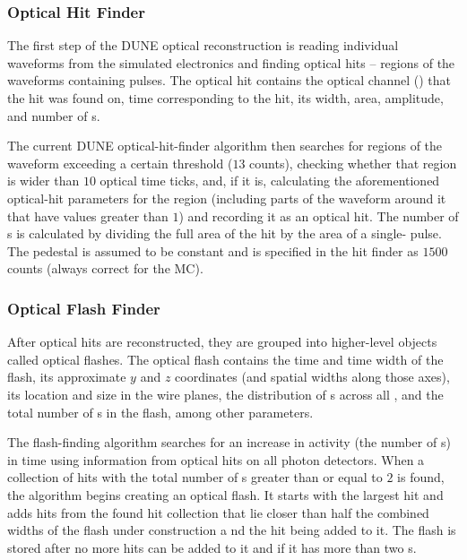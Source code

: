 \subsubsection{Optical Hit Finder}
\label{sec:OpticalHitFinder}
The first step of the DUNE optical reconstruction is reading
individual waveforms from the simulated  electronics
and finding optical hits -- regions of the waveforms containing pulses.
The optical hit contains the optical channel () that the hit
was found on, time corresponding to the hit, its width,
area, amplitude, and number of \phel{}s.


The current DUNE optical-hit-finder algorithm then searches for regions of the waveform
exceeding a certain threshold ($13$  counts), checking whether that region
is wider than $10$ optical time ticks, and, if it is, calculating the aforementioned
optical-hit parameters for the region (including parts of the waveform around it
that have  values greater than $1$) and recording it as an optical hit.
The number of \phel{}s is calculated by dividing the full area of the hit
by the area of a single-\phel{} pulse.
The pedestal is assumed to be constant and is specified in the hit finder as $1500$  counts (always correct for the MC).


\subsubsection{Optical Flash Finder}
After optical hits are reconstructed, they are grouped into higher-level objects called optical flashes.
The optical flash contains the time and time width of the flash,
its approximate $y$ and $z$ coordinates (and spatial widths along those axes),
its location and size in the wire planes,
the distribution of \phel{}s across all ,
and the total number of \phel{}s in the flash, among other parameters.

The flash-finding algorithm searches for an increase in  activity
(the number of \phel{}s) in time using information from optical hits
on all photon detectors.
When a collection of hits with the total number of \phel{}s  
greater than or equal to $2$ is found, the algorithm begins creating an optical flash.
It starts with the largest hit and adds hits from the found hit collection 
that lie closer than half the combined widths of the flash under construction
a nd the hit being added to it.
The flash is stored after no more hits can be added to it
and if it has more than two \phel{}s.

